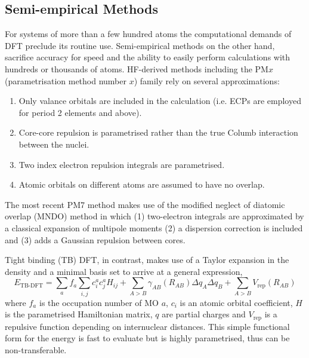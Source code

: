 \documentclass[main.tex]{subfiles}
\begin{document}
\subsection{Semi-empirical Methods}

For systems of more than a few hundred atoms the computational demands of DFT preclude its routine use. Semi-empirical methods on the other hand, sacrifice accuracy for speed and the ability to easily perform calculations with hundreds or thousands of atoms.\cite{Christensen2016} HF-derived methods including the PM$x$ (parametrisation method number $x$) family rely on several approximations:

\begin{enumerate}
	\item Only valance orbitals are included in the calculation (i.e. ECPs are employed for period 2 elements and above).
	\item Core-core repulsion is parametrised rather than the true Columb interaction between the nuclei.
	\item Two index electron repulsion integrals are parametrised.
	\item Atomic orbitals on different atoms are assumed to have no overlap.
\end{enumerate}

The most recent PM7 method makes use of the modified neglect of diatomic overlap (MNDO) method in which (1) two-electron integrals are approximated by a classical expansion of multipole moments (2) a dispersion correction is included and (3) adds a Gaussian repulsion between cores.

Tight binding (TB) DFT, in contrast, makes use of a Taylor expansion in the density and a minimal basis set to arrive at a general expression,
\begin{equation}
	E_\text{TB-DFT} = \sum_a f_a \sum_{i, j} c_i^a c_j^a H_{ij} + \sum_{A > B} \gamma_{AB}(R_{AB}) \Delta q_A \Delta q_B + \sum_{A > B} V_\text{rep}(R_{AB})
\end{equation}
where $f_a$ is the occupation number of MO $a$, $c_i$ is an atomic orbital coefficient, $H$ is the parametrised Hamiltonian matrix, $q$ are partial charges and $V_\text{rep}$ is a repulsive function depending on internuclear distances. This simple functional form for the energy is fast to evaluate but is highly parametrised, thus can be non-transferable.\cite{Gaus2011}

\end{document}
